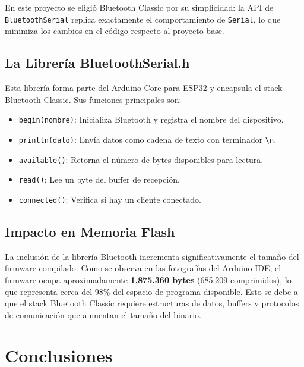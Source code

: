 \documentclass[12pt,a4paper]{article}
\begin{document}
En este proyecto se eligió Bluetooth Classic por su simplicidad: la API de \texttt{BluetoothSerial} replica exactamente el comportamiento de \texttt{Serial}, lo que minimiza los cambios en el código respecto al proyecto base.

\subsection{La Librería BluetoothSerial.h}

Esta librería forma parte del Arduino Core para ESP32 y encapsula el stack Bluetooth Classic. Sus funciones principales son:

\begin{itemize}
    \item \texttt{begin(nombre)}: Inicializa Bluetooth y registra el nombre del dispositivo.
    \item \texttt{println(dato)}: Envía datos como cadena de texto con terminador \texttt{\textbackslash n}.
    \item \texttt{available()}: Retorna el número de bytes disponibles para lectura.
    \item \texttt{read()}: Lee un byte del buffer de recepción.
    \item \texttt{connected()}: Verifica si hay un cliente conectado.
\end{itemize}

\subsection{Impacto en Memoria Flash}

La inclusión de la librería Bluetooth incrementa significativamente el tamaño del firmware compilado. Como se observa en las fotografías del Arduino IDE, el firmware ocupa aproximadamente \textbf{1.875.360 bytes} (685.209 comprimidos), lo que representa cerca del 98\% del espacio de programa disponible. Esto se debe a que el stack Bluetooth Classic requiere estructuras de datos, buffers y protocolos de comunicación que aumentan el tamaño del binario.

\section{Conclusiones}
\end{document}
